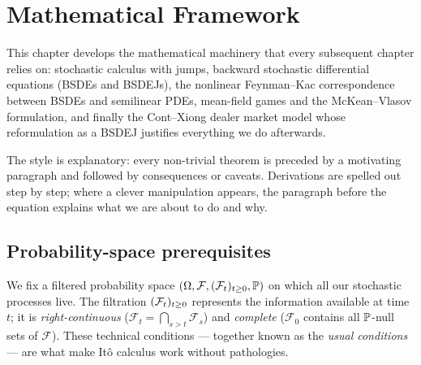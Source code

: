 \chapter{Mathematical Framework}
\label{ch:math}

This chapter develops the mathematical machinery that every subsequent chapter relies on: stochastic calculus with jumps, backward stochastic differential equations (BSDEs and BSDEJs), the nonlinear Feynman--Kac correspondence between BSDEs and semilinear PDEs, mean-field games and the McKean--Vlasov formulation, and finally the Cont--Xiong dealer market model whose reformulation as a BSDEJ justifies everything we do afterwards.

The style is explanatory: every non-trivial theorem is preceded by a motivating paragraph and followed by consequences or caveats. Derivations are spelled out step by step; where a clever manipulation appears, the paragraph before the equation explains what we are about to do and why.

\section{Probability-space prerequisites}
\label{sec:prereqs}

We fix a filtered probability space $(\Omega, \mathcal{F}, (\mathcal{F}_t)_{t \geq 0}, \mathbb{P})$ on which all our stochastic processes live. The filtration $(\mathcal{F}_t)_{t \geq 0}$ represents the information available at time $t$; it is \emph{right-continuous} ($\mathcal{F}_t = \bigcap_{s > t} \mathcal{F}_s$) and \emph{complete} ($\mathcal{F}_0$ contains all $\mathbb{P}$-null sets of $\mathcal{F}$). These technical conditions --- together known as the \emph{usual conditions} --- are what make It\^o calculus work without pathologies.

